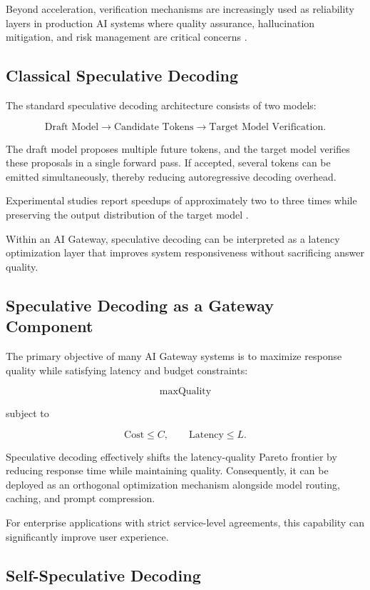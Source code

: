 \documentclass[11pt,a4paper]{article}
\begin{document}
Beyond acceleration, verification mechanisms are increasingly used as reliability layers in production AI systems where quality assurance, hallucination mitigation, and risk management are critical concerns \cite{frugalgpt,routellm}.

\subsection{Classical Speculative Decoding}

The standard speculative decoding architecture consists of two models:

\[
\text{Draft Model}
\rightarrow
\text{Candidate Tokens}
\rightarrow
\text{Target Model Verification}.
\]

The draft model proposes multiple future tokens, and the target model verifies these proposals in a single forward pass. If accepted, several tokens can be emitted simultaneously, thereby reducing autoregressive decoding overhead.

Experimental studies report speedups of approximately two to three times while preserving the output distribution of the target model \cite{leviathan2023speculative,chen2023speculative}.

Within an AI Gateway, speculative decoding can be interpreted as a latency optimization layer that improves system responsiveness without sacrificing answer quality.

\subsection{Speculative Decoding as a Gateway Component}

The primary objective of many AI Gateway systems is to maximize response quality while satisfying latency and budget constraints:

\[
\max \text{Quality}
\]

subject to

\[
\text{Cost} \leq C,
\qquad
\text{Latency} \leq L.
\]

Speculative decoding effectively shifts the latency-quality Pareto frontier by reducing response time while maintaining quality. Consequently, it can be deployed as an orthogonal optimization mechanism alongside model routing, caching, and prompt compression.

For enterprise applications with strict service-level agreements, this capability can significantly improve user experience.

\subsection{Self-Speculative Decoding}
\end{document}
